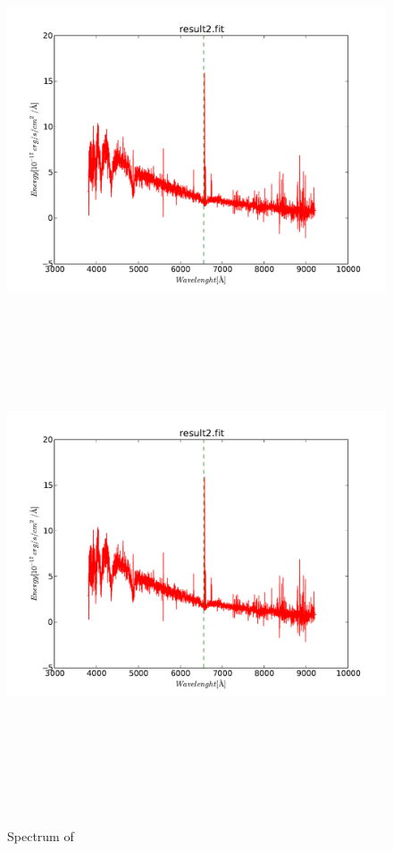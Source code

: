    \begin{figure}[!htbp]
      \begin{center}
        \leavevmode
        \ifpdf
        \includegraphics[scale =.8]{result2}
        \else
        \includegraphics[bb = 92 86 545 742, height=6in]{result2}
        \fi
        \caption{Spectrum of }
        \label{FigResult2}
      \end{center}
    \end{figure}

